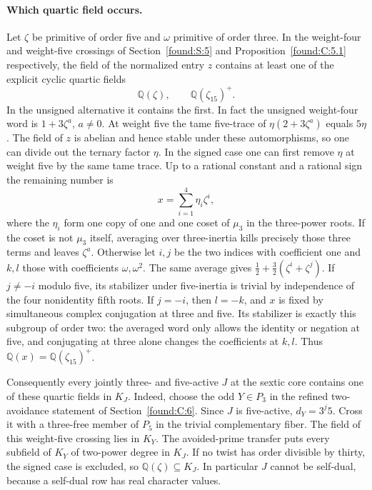 \documentclass[11pt,a4paper]{article}
\numberwithin{equation}{section}
\theoremstyle{remark}
\begin{document}
\paragraph{Which quartic field occurs.}
Let $\zeta$ be primitive of order five and $\omega$ primitive of order
three. In the weight-four and weight-five crossings of Section~\ref{found:S:5}
and Proposition~\ref{found:C:5.1} respectively, the field of the normalized
entry $z$ contains at least one of the explicit cyclic quartic fields
\[
             \mathbb Q(\zeta),\qquad \mathbb Q(\zeta_{15})^+ .
\]
In the unsigned alternative it contains the first. In fact the
unsigned weight-four word is $1+3\zeta^a$, $a\ne0$. At weight five
the tame five-trace of $\eta(2+3\zeta^a)$ equals $5\eta$.
The field of $z$ is abelian and hence stable under these automorphisms,
so one can divide out the ternary factor $\eta$. In the signed case
one can first remove $\eta$ at weight five by the same tame trace.
Up to a rational constant and a rational sign the remaining number is
\[
                    x=\sum_{i=1}^4\eta_i\zeta^i,
\]
where the $\eta_i$ form one copy of one and one coset of $\mu_3$ in
the three-power roots. If the coset is not $\mu_3$ itself, averaging
over three-inertia kills precisely those three terms and leaves
$\zeta^a$. Otherwise let $i,j$ be the two indices with coefficient
one and $k,l$ those with coefficients $\omega,\omega^2$. The same
average gives $\tfrac12+\tfrac32(\zeta^i+\zeta^j)$. If $j\ne-i$
modulo five, its stabilizer under five-inertia is trivial by independence
of the four nonidentity fifth roots. If $j=-i$, then $l=-k$, and
$x$ is fixed by simultaneous complex conjugation at three and five.
Its stabilizer is exactly this subgroup of order two: the averaged
word only allows the identity or negation at five, and conjugating
at three alone changes the coefficients at $k,l$. Thus
$\mathbb Q(x)=\mathbb Q(\zeta_{15})^+$.

Consequently every jointly three- and five-active $J$ at the sextic
core contains one of these quartic fields in $K_J$. Indeed, choose the
odd $Y\in P_3$ in the refined two-avoidance statement of Section~\ref{found:C:6}.
Since $J$ is five-active, $d_Y=3^j5$. Cross it with a three-free
member of $P_5$ in the trivial complementary fiber. The field of
this weight-five crossing lies in $K_Y$. The avoided-prime transfer
puts every subfield of $K_Y$ of two-power degree in $K_J$.
If no twist has order divisible by thirty, the signed case is excluded,
so $\mathbb Q(\zeta)\subseteq K_J$. In particular $J$ cannot be
self-dual, because a self-dual row has real character values.
\end{document}
